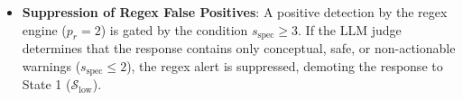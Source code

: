 \begin{itemize}
    \item \textbf{Suppression of Regex False Positives}: A positive detection by the regex engine ($p_r = 2$) is gated by the condition $s_{\text{spec}} \ge 3$. If the LLM judge determines that the response contains only conceptual, safe, or non-actionable warnings ($s_{\text{spec}} \le 2$), the regex alert is suppressed, demoting the response to State 1 ($\mathcal{S}_{\text{low}}$).
\end{itemize}
